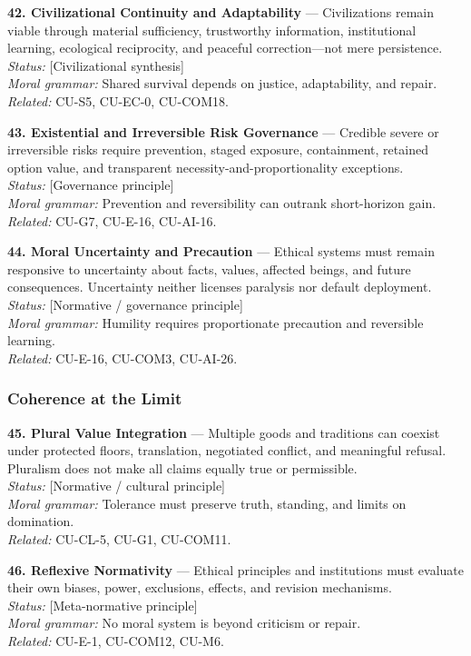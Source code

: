\documentclass[
  11pt,
]{article}
\begin{document}
\textbf{42. Civilizational Continuity and Adaptability} ---
Civilizations remain viable through material sufficiency, trustworthy
information, institutional learning, ecological reciprocity, and
peaceful correction---not mere persistence.\\
\emph{Status:} {[}Civilizational synthesis{]}\\
\emph{Moral grammar:} Shared survival depends on justice, adaptability,
and repair.\\
\emph{Related:} CU-S5, CU-EC-0, CU-COM18.

\textbf{43. Existential and Irreversible Risk Governance} --- Credible
severe or irreversible risks require prevention, staged exposure,
containment, retained option value, and transparent
necessity-and-proportionality exceptions.\\
\emph{Status:} {[}Governance principle{]}\\
\emph{Moral grammar:} Prevention and reversibility can outrank
short-horizon gain.\\
\emph{Related:} CU-G7, CU-E-16, CU-AI-16.

\textbf{44. Moral Uncertainty and Precaution} --- Ethical systems must
remain responsive to uncertainty about facts, values, affected beings,
and future consequences. Uncertainty neither licenses paralysis nor
default deployment.\\
\emph{Status:} {[}Normative / governance principle{]}\\
\emph{Moral grammar:} Humility requires proportionate precaution and
reversible learning.\\
\emph{Related:} CU-E-16, CU-COM3, CU-AI-26.

\subsubsection{Coherence at the Limit}\label{coherence-at-the-limit}

\textbf{45. Plural Value Integration} --- Multiple goods and traditions
can coexist under protected floors, translation, negotiated conflict,
and meaningful refusal. Pluralism does not make all claims equally true
or permissible.\\
\emph{Status:} {[}Normative / cultural principle{]}\\
\emph{Moral grammar:} Tolerance must preserve truth, standing, and
limits on domination.\\
\emph{Related:} CU-CL-5, CU-G1, CU-COM11.

\textbf{46. Reflexive Normativity} --- Ethical principles and
institutions must evaluate their own biases, power, exclusions, effects,
and revision mechanisms.\\
\emph{Status:} {[}Meta-normative principle{]}\\
\emph{Moral grammar:} No moral system is beyond criticism or repair.\\
\emph{Related:} CU-E-1, CU-COM12, CU-M6.
\end{document}
